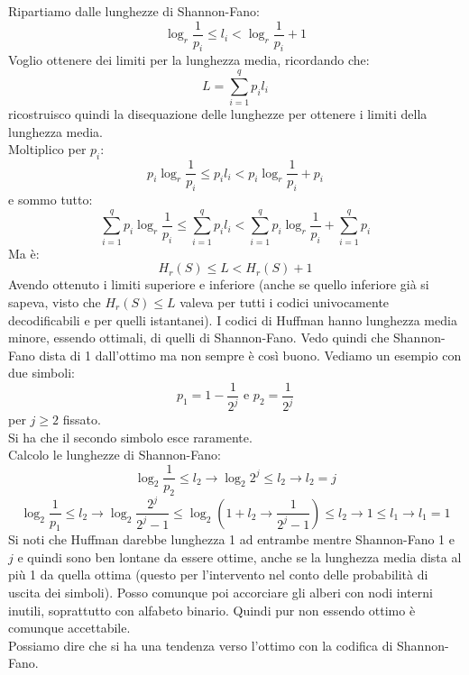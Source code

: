 \documentclass[a4paper,12pt, oneside]{book}
\begin{document}
Ripartiamo dalle lunghezze di Shannon-Fano:
\[\log_r \frac{1}{p_i}\leq l_i< \log_r\frac{1}{p_i}+1\]
Voglio ottenere dei limiti per la lunghezza media, ricordando che:
\[L=\sum_{i=1}^q p_il_i\]
ricostruisco quindi la disequazione delle lunghezze per ottenere i limiti della
lunghezza media.\\
Moltiplico per $p_i$:
\[p_i\log_r \frac{1}{p_i}\leq p_il_i<p_i \log_r\frac{1}{p_i}+p_i\]
e sommo tutto:
\[\sum_{i=1}^qp_i\log_r \frac{1}{p_i}\leq \sum_{i=1}^qp_il_i<\sum_{i=1}^qp_i
  \log_r\frac{1}{p_i}+\sum_{i=1}^q p_i\] 
Ma è:
\[H_r(S)\leq L< H_r(S)+1\]
Avendo ottenuto i limiti superiore e inferiore (anche se quello inferiore già si
sapeva, visto che $H_r(S)\leq L$ valeva per tutti i codici univocamente
decodificabili e per quelli istantanei). I codici di Huffman hanno lunghezza
media minore, essendo ottimali, di quelli di Shannon-Fano. Vedo quindi che
Shannon-Fano dista di 1 dall'ottimo ma non sempre è così buono. Vediamo un
esempio con due simboli:
\[p_1=1-\frac{1}{2^j}\mbox{ e }p_2=\frac{1}{2^j}\]
per $j\geq 2$ fissato.\\
Si ha che il secondo simbolo esce raramente.\\
Calcolo le lunghezze di Shannon-Fano:
\[\log_2\frac{1}{p_2}\leq l_2\to \log_2 2^j\leq l_2\to l_2=j\]
\[\log_2\frac{1}{p_1}\leq l_2\to\log_2\frac{2^j}{2^j-1}\leq\log_2\left( 1+ l_2\to
    \frac{1}{2^j-1}\right)\leq l_2\to 1\leq l_1\to l_1=1\]
Si noti che Huffman darebbe lunghezza 1 ad entrambe mentre Shannon-Fano 1 e $j$
e quindi sono ben lontane da essere ottime, anche se la lunghezza media dista al
più 1 da quella ottima (questo per l'intervento nel conto delle probabilità di
uscita dei simboli). Posso comunque poi accorciare gli alberi con nodi interni
inutili, soprattutto con alfabeto binario. Quindi pur non essendo ottimo è
comunque accettabile.\\ 
Possiamo dire che si ha una tendenza verso l'ottimo con la codifica di
Shannon-Fano.
\end{document}
